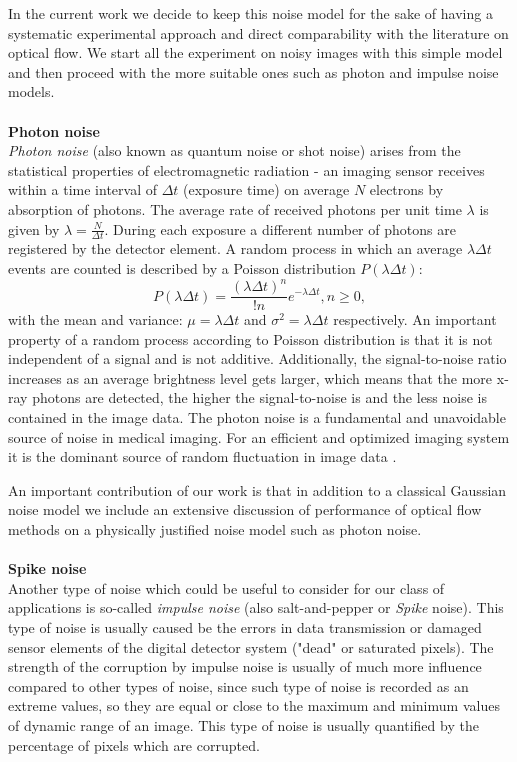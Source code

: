 In the current work we decide to keep this noise model for the sake of having a systematic experimental approach and direct comparability with the literature on optical flow. We start all the experiment on noisy images with this simple model and then proceed with the more suitable ones such as photon and impulse noise models. 
\\
\\
\textbf{Photon noise}
\\
\textit{Photon noise} (also known as quantum noise or shot noise) arises from the statistical properties of electromagnetic radiation - an imaging sensor receives within a time interval of $\Delta t$ (exposure time) on average $N$ electrons by absorption of photons. The average rate of received photons per unit time $\lambda$ is given by $\lambda = \frac{N}{\Delta t}.$  During each exposure a different number of photons are registered by the detector element. A random process in which an average $\lambda \Delta t$ events are counted is described by a Poisson distribution $P(\lambda \Delta t)$:
$$ P(\lambda \Delta t) = \frac{(\lambda \Delta t)^n}{!n}  e^{- \lambda \Delta t}, n \geq 0,$$
with the mean and variance: $\mu = \lambda \Delta t $ and $\sigma^2 = \lambda \Delta t$ respectively.  An important property of a random process according to Poisson distribution is that it is not independent of a signal and is not additive. Additionally, the signal-to-noise ratio increases as an average brightness level gets larger, which means that the more x-ray photons are detected, the higher the signal-to-noise is and the less noise is contained in the image data. The
photon noise is a fundamental and unavoidable source of noise in medical imaging. For an efficient and optimized imaging system it is the dominant source of random fluctuation in image data \cite{Dougherty09}.

An important contribution of our work is that in addition to a classical Gaussian noise model we include an extensive discussion of performance of optical flow methods on a physically justified noise model such as photon noise.
\\
\\
\textbf{Spike noise}
\\
Another type of noise which could be useful to consider for our class of applications is so-called \textit{impulse noise} (also salt-and-pepper or \textit{Spike} noise). This type of noise is usually caused be the errors in data transmission or damaged sensor elements  of the digital detector system ("dead" or saturated pixels).  The strength of the corruption by impulse noise is usually of much more influence compared to other types of noise, since such type of noise is recorded as an extreme values, so they are equal or close to the maximum and minimum values of dynamic range of an image.
This type of noise is usually quantified by the percentage of pixels which are corrupted.

